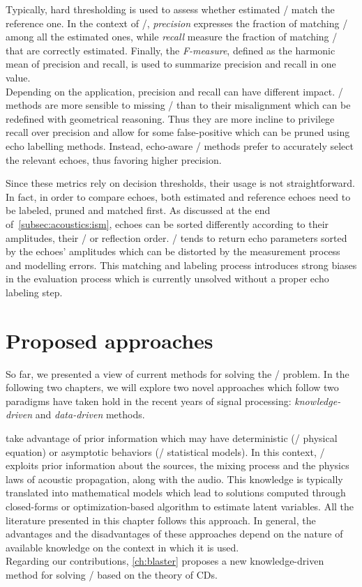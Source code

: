 \begin{itemize}
{\begin{equation*}
        \end{equation*}
    } Typically, hard thresholding is used to assess whether estimated \TOAs/ match the reference one.
    In the context of \AER/, \textit{precision} expresses the fraction of matching \TOAs/ among all the estimated ones, while \textit{recall} measure the fraction of matching \TOAs/ that are correctly estimated.
    Finally, the \textit{F-measure}, defined as the harmonic mean of precision and recall, is used to summarize precision and recall in one value.
    \\Depending on the application, precision and recall can have different impact.
    \RooGE/ methods are more sensible to missing \TOAs/ than to their misalignment which can be redefined with geometrical reasoning.
    Thus they are more incline to privilege recall over precision and allow for some false-positive which can be pruned using echo labelling methods.
    Instead, echo-aware \SE/ methods prefer to accurately select the relevant echoes, thus favoring higher precision.
\end{itemize}

\mynewline
Since these metrics rely on decision thresholds, their usage is not straightforward.
In fact, in order to compare echoes, both estimated and reference echoes need to be labeled, pruned and matched first.
As discussed at the end of~\cref{subsec:acoustics:ism}, echoes can be sorted differently according to their amplitudes, their \TOAs/ or reflection order.
\AER/ tends to return echo parameters sorted by the echoes' amplitudes which can be distorted by the measurement process and modelling errors.
This matching and labeling process introduces strong biases in the evaluation process which is currently unsolved without a proper echo labeling step.

\section{Proposed approaches}
So far, we presented a view of current methods for solving the \AER/ problem.
In the following two chapters, we will explore two novel approaches which follow two paradigms have taken hold in the recent years of signal processing:
\textit{knowledge-driven} and \textit{data-driven} methods.

 take advantage of prior information which may have deterministic (\eg/ physical equation) or asymptotic behaviors (\eg/ statistical models).
In this context, \AER/ exploits prior information about the sources, the mixing process and the physics laws of acoustic propagation, along with the audio.
This knowledge is typically translated into mathematical models which lead to solutions computed through closed-forms or optimization-based algorithm to estimate latent variables.
All the literature presented in this chapter follows this approach.
In general, the advantages and the disadvantages of these approaches depend on the nature of available knowledge on the context in which it is used.
\\Regarding our contributions, \cref{ch:blaster} proposes a new knowledge-driven method for solving \AER/ based on the theory of \acfp{CD}.

